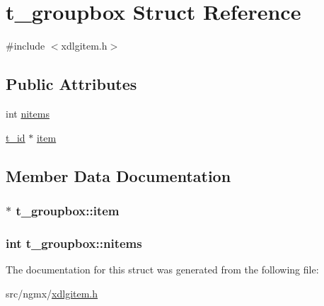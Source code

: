 \hypertarget{structt__groupbox}{\section{t\-\_\-groupbox \-Struct \-Reference}
\label{structt__groupbox}
}


{\ttfamily \#include $<$xdlgitem.\-h$>$}

\subsection*{\-Public \-Attributes}
\begin{DoxyCompactItemize}
\item 
int \hyperlink{structt__groupbox_a462d96a3fbc2bb4cfb4ab59689fdc178}{nitems}
\item 
\hyperlink{xdlgitem_8h_aa48ef3a63f16552c3ae513baa87d8942}{t\-\_\-id} $\ast$ \hyperlink{structt__groupbox_af04584a745ab24dac887c232fb74671c}{item}
\end{DoxyCompactItemize}


\subsection{\-Member \-Data \-Documentation}
\hypertarget{structt__groupbox_af04584a745ab24dac887c232fb74671c}{
\subsubsection[{item}]{$\ast$ {\bf t\-\_\-groupbox\-::item}}}\label{structt__groupbox_af04584a745ab24dac887c232fb74671c}
\hypertarget{structt__groupbox_a462d96a3fbc2bb4cfb4ab59689fdc178}{
\subsubsection[{nitems}]{\setlength{\rightskip}{0pt plus 5cm}int {\bf t\-\_\-groupbox\-::nitems}}}\label{structt__groupbox_a462d96a3fbc2bb4cfb4ab59689fdc178}


\-The documentation for this struct was generated from the following file\-:\begin{DoxyCompactItemize}
\item 
src/ngmx/\hyperlink{xdlgitem_8h}{xdlgitem.\-h}\end{DoxyCompactItemize}
